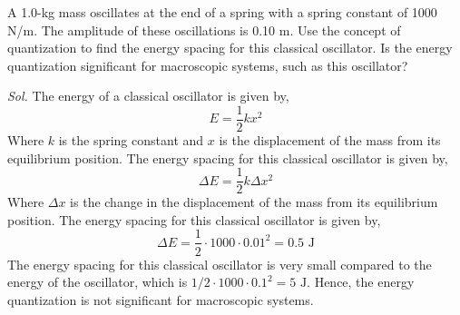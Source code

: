 \documentclass{article}
\theoremstyle{mytheoremstyle}
\theoremstyle{mytheoremstyle}
\theoremstyle{myproblemstyle}
\begin{document}
\begin{problem}
A 1.0-kg mass oscillates at the end of a spring with a spring constant of 1000 N/m. The amplitude of these oscillations is 0.10 m. Use the concept of quantization to find the energy spacing for this classical oscillator. Is the energy quantization significant for macroscopic systems, such as this oscillator?
\end{problem}
\textit{ Sol. } The energy of a classical oscillator is given by,
\[E = \frac{1}{2}kx^2\]
Where \(k\) is the spring constant and \(x\) is the displacement of the mass from its equilibrium position. The energy spacing for this classical oscillator is given by,
\[\Delta E = \frac{1}{2}k\Delta x^2\]
Where \(\Delta x\) is the change in the displacement of the mass from its equilibrium position. The energy spacing for this classical oscillator is given by,
\[\Delta E = \frac{1}{2} \cdot 1000 \cdot 0.01^2 = 0.5 \text{ J}\]
The energy spacing for this classical oscillator is very small compared to the energy of the oscillator, which is \(1/2 \cdot 1000 \cdot 0.1^2 = 5 \text{ J}\). Hence, the energy quantization is not significant for macroscopic systems.
\end{document}
